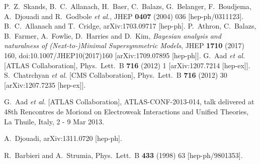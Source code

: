 \documentclass[final,3p,times]{elsarticle}
\begin{document}
\begin{thebibliography}{10}
  P.~Z.~Skands, B.~C.~Allanach, H.~Baer, C.~Balazs, G.~Belanger, F.~Boudjema, A.~Djouadi and R.~Godbole {\it et al.},
  JHEP {\bf 0407} (2004) 036
  [hep-ph/0311123].
  B.~C.~Allanach and T.~Cridge,
  arXiv:1703.09717 [hep-ph].
 P.~Athron, C.~Balazs, B.~Farmer, A.~Fowlie, D.~Harries and D.~Kim,
  {\em Bayesian analysis and naturalness of (Next-to-)Minimal Supersymmetric Models},
  JHEP {\bf 1710} (2017) 160,
  doi:10.1007/JHEP10(2017)160
  [arXiv:1709.07895 [hep-ph]].
  G.~Aad {\it et al.}  [ATLAS Collaboration],
  Phys.\ Lett.\ B {\bf 716} (2012) 1
  [arXiv:1207.7214 [hep-ex]].
  S.~Chatrchyan {\it et al.}  [CMS Collaboration],
  Phys.\ Lett.\ B {\bf 716} (2012) 30
  [arXiv:1207.7235 [hep-ex]].

G.~Aad {\it et al.}  [ATLAS Collaboration],
ATLAS-CONF-2013-014, talk delivered at 48th Rencontres de Moriond on Electroweak Interactions and Unified Theories, La Thuile, Italy, 2 - 9 Mar 2013.


  A.~Djouadi,
  arXiv:1311.0720 [hep-ph].

  R.~Barbieri and A.~Strumia,
  Phys.\ Lett.\ B {\bf 433} (1998) 63
  [hep-ph/9801353].


\end{thebibliography}
\end{document}

